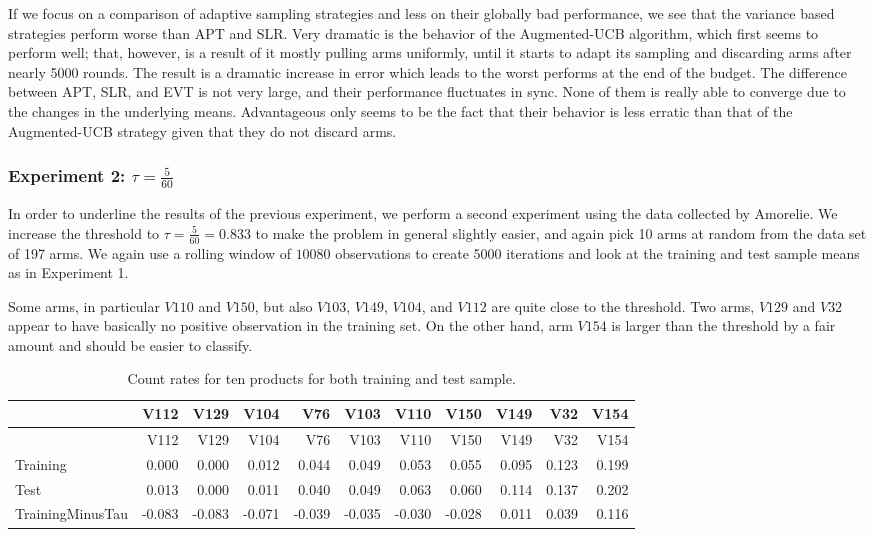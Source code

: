\documentclass[12pt,]{article}
\begin{document}
If we focus on a comparison of adaptive sampling strategies and less on
their globally bad performance, we see that the variance based
strategies perform worse than APT and SLR. Very dramatic is the behavior
of the Augmented-UCB algorithm, which first seems to perform well; that,
however, is a result of it mostly pulling arms uniformly, until it
starts to adapt its sampling and discarding arms after nearly 5000
rounds. The result is a dramatic increase in error which leads to the
worst performs at the end of the budget. The difference between APT,
SLR, and EVT is not very large, and their performance fluctuates in
sync. None of them is really able to converge due to the changes in the
underlying means. Advantageous only seems to be the fact that their
behavior is less erratic than that of the Augmented-UCB strategy given
that they do not discard arms.

\subsubsection{\texorpdfstring{Experiment 2:
\(\tau = \frac{5}{60}\)}{Experiment 2: \textbackslash{}tau = \textbackslash{}frac\{5\}\{60\}}}\label{experiment-2-tau-frac560}

In order to underline the results of the previous experiment, we perform
a second experiment using the data collected by Amorelie. We increase
the threshold to \(\tau = \frac{5}{60} = 0.833\) to make the problem in
general slightly easier, and again pick 10 arms at random from the data
set of 197 arms. We again use a rolling window of \(10080\) observations
to create \(5000\) iterations and look at the training and test sample
means as in Experiment 1.

Some arms, in particular \(V110\) and \(V150\), but also \(V103\),
\(V149\), \(V104\), and \(V112\) are quite close to the threshold. Two
arms, \(V129\) and \(V32\) appear to have basically no positive
observation in the training set. On the other hand, arm \(V154\) is
larger than the threshold by a fair amount and should be easier to
classify.

\begin{longtable}[]{@{}lrrrrrrrrrr@{}}
\caption{Count rates for ten products for both training and test
sample.}\tabularnewline
\toprule
& V112 & V129 & V104 & V76 & V103 & V110 & V150 & V149 & V32 &
V154\tabularnewline
\midrule
\endfirsthead
\toprule
& V112 & V129 & V104 & V76 & V103 & V110 & V150 & V149 & V32 &
V154\tabularnewline
\midrule
\endhead
Training & 0.000 & 0.000 & 0.012 & 0.044 & 0.049 & 0.053 & 0.055 & 0.095
& 0.123 & 0.199\tabularnewline
Test & 0.013 & 0.000 & 0.011 & 0.040 & 0.049 & 0.063 & 0.060 & 0.114 &
0.137 & 0.202\tabularnewline
TrainingMinusTau & -0.083 & -0.083 & -0.071 & -0.039 & -0.035 & -0.030 &
-0.028 & 0.011 & 0.039 & 0.116\tabularnewline
\bottomrule
\end{longtable}
\end{document}
